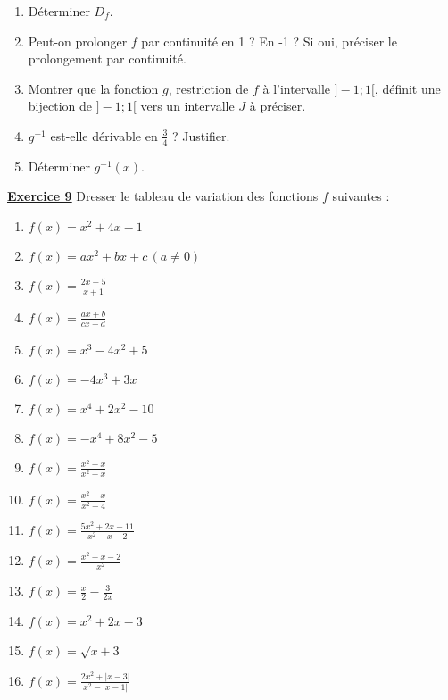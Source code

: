 \documentclass[12pt,a4paper]{article}
\begin{document}
\begin{multicols}{2}
\begin{enumerate}
    \item Déterminer \( D_f \).
    \item Peut-on prolonger \( f \) par continuité en 1 ? En -1 ? Si oui, préciser le prolongement par continuité.
    \item Montrer que la fonction \( g \), restriction de \( f \) à l'intervalle \( ]-1;1[ \), définit une bijection de \( ]-1;1[ \) vers un intervalle \( J \) à préciser.
    \item \( g^{-1} \) est-elle dérivable en \( \frac{3}{4} \) ? Justifier.
    \item Déterminer \( g^{-1}(x) \).
\end{enumerate}
\textbf{\underline{Exercice 9}}
Dresser le tableau de variation des fonctions \( f \) suivantes :

\begin{enumerate}
    \item \( f(x) = x^2 + 4x - 1 \)
    \item \( f(x) = ax^2 + bx + c \, (a \neq 0) \)
    \item \( f(x) = \frac{2x - 5}{x + 1} \)
    \item \( f(x) = \frac{ax + b}{cx + d} \)
    \item \( f(x) = x^3 - 4x^2 + 5 \)
    \item \( f(x) = -4x^3 + 3x \)
    \item \( f(x) = x^4 + 2x^2 - 10 \)
    \item \( f(x) = -x^4 + 8x^2 - 5 \)
    \item \( f(x) = \frac{x^2 - x}{x^2 + x} \)
    \item \( f(x) = \frac{x^2 + x}{x^2 - 4} \)
    \item \( f(x) = \frac{5x^2 + 2x - 11}{x^2 - x - 2} \)
    \item \( f(x) = \frac{x^2 + x - 2}{x^2} \)
    \item \( f(x) = \frac{x}{2} - \frac{3}{2x} \)
    \item \( f(x) = x^2 + 2x - 3 \)
    \item \( f(x) = \sqrt{x + 3} \)
    \item \( f(x) = \frac{2x^2 + |x - 3|}{x^2 - |x - 1|} \)
\end{enumerate}
\end{multicols}
\end{document}
